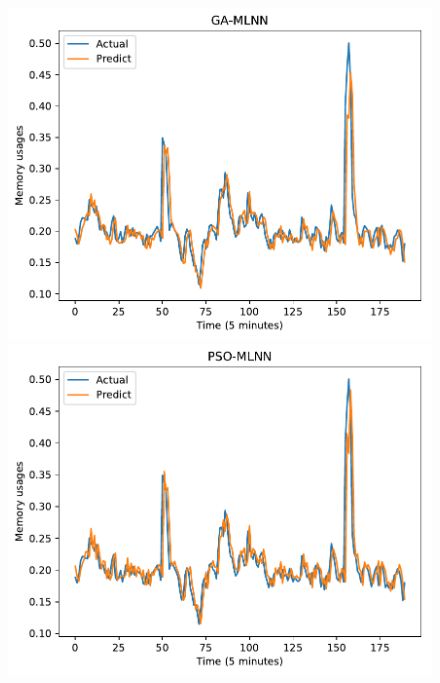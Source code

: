 \documentclass[11pt,twoside]{article}
\begin{document}
\begin{multicols}{2}
\begin{figure}[!ht] 
  \begin{minipage}[b]{0.33\linewidth}
    \centering
    \includegraphics[width=0.9\linewidth]{images/pdf/predict/k5/ram_k5_ga_mlnn.pdf} 
  \end{minipage}
  \begin{minipage}[b]{0.33\linewidth}
    \centering
    \includegraphics[width=0.9\linewidth]{images/pdf/predict/k5/ram_k5_pso_mlnn.pdf} 
  \end{minipage} 
  \begin{minipage}[b]{0.33\linewidth}
    \centering

\end{minipage}
\end{figure}
\end{multicols}
\end{document}
